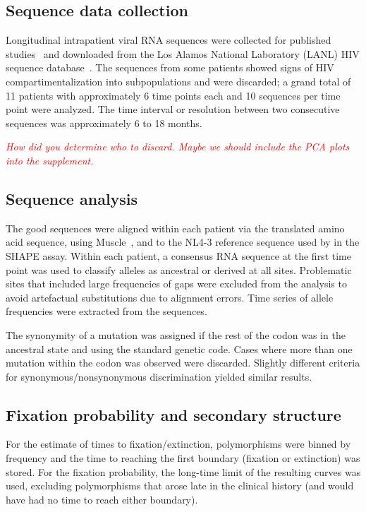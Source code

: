 \documentclass[rmp, twocolumn]{revtex4}
\newcommand{\comment}[1]{\textit{\textcolor{red}{#1}}}
\begin{document}
\subsection{Sequence data collection}
Longitudinal intrapatient viral RNA sequences were collected for published
studies~\citep{shankarappa_consistent_1999,
liu_selection_2006, bunnik_autologous_2008} and downloaded from the Los Alamos
National Laboratory (LANL) HIV sequence database~\citep{LANL2012}. The sequences from
some patients showed signs of HIV compartimentalization into subpopulations and
were discarded; a grand total of 11
patients with approximately 6 time points each and 10 sequences per time point
were analyzed. The time interval or resolution between two consecutive sequences
was approximately 6 to 18 months.

\comment{How did you determine who to discard. Maybe we should include the PCA
plots into the supplement.}


\subsection{Sequence analysis}
The good sequences were aligned within each patient
via the translated amino acid sequence, using
Muscle~\citep{edgar_muscle:_2004}, and to the NL4-3 reference sequence used
by \citet{watts_architecture_2009} in the SHAPE assay. Within each patient, a
consensus RNA sequence at the first time point was used to classify alleles as ancestral or
derived at all sites. Problematic sites that included large frequencies of gaps
were excluded from the analysis to avoid artefactual substitutions due to
alignment errors. Time series of allele frequencies were extracted from the
sequences.

The synonymity of a mutation was assigned if the rest of the codon was
in the ancestral state and using the standard genetic code. Cases where more
than one mutation within the codon was observed were discarded. Slightly
different criteria for synonymous/nonsynonymous discrimination yielded similar
results.

\subsection{Fixation probability and secondary structure}
For the estimate of times to fixation/extinction, polymorphisms were
binned by frequency and the time to reaching the first boundary (fixation or
extinction) was stored. For the fixation probability, the long-time limit of the
resulting curves was used, excluding polymorphisms that arose late in the
clinical history (and would have had no time to reach either boundary).
\end{document}
